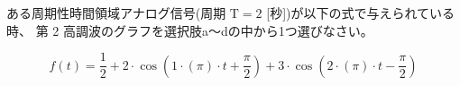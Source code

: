 ある周期性時間領域アナログ信号(周期 $\textrm{T} = 2$ [秒])が以下の式で与えられている時、
第 2 高調波のグラフを選択肢a〜dの中から1つ選びなさい。

\[
f(t) = 
\frac{1}{2}
+ 2 \cdot \cos \left ( 1 \cdot (\pi) \cdot t + \frac{\pi}{2} \right )
+ 3 \cdot \cos \left ( 2 \cdot (\pi) \cdot t - \frac{\pi}{2} \right )
\]
